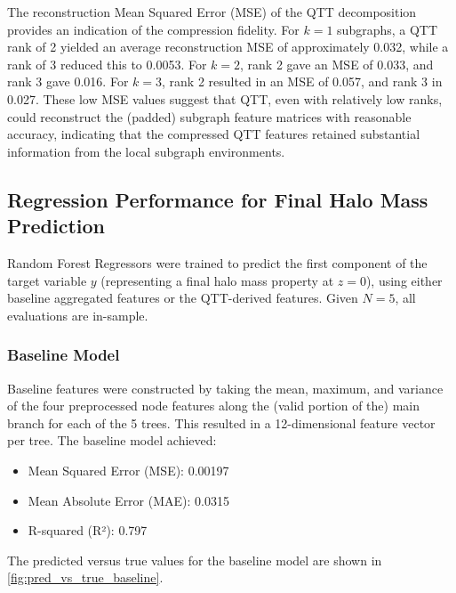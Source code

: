 \documentclass[twocolumn]{aastex631}
\begin{document}
The reconstruction Mean Squared Error (MSE) of the QTT decomposition provides an indication of the compression fidelity. For $k=1$ subgraphs, a QTT rank of 2 yielded an average reconstruction MSE of approximately 0.032, while a rank of 3 reduced this to 0.0053. For $k=2$, rank 2 gave an MSE of 0.033, and rank 3 gave 0.016. For $k=3$, rank 2 resulted in an MSE of 0.057, and rank 3 in 0.027. These low MSE values suggest that QTT, even with relatively low ranks, could reconstruct the (padded) subgraph feature matrices with reasonable accuracy, indicating that the compressed QTT features retained substantial information from the local subgraph environments.

\subsection{Regression Performance for Final Halo Mass Prediction}

Random Forest Regressors were trained to predict the first component of the target variable $y$ (representing a final halo mass property at $z=0$), using either baseline aggregated features or the QTT-derived features. Given $N=5$, all evaluations are in-sample.

\subsubsection{Baseline Model}
Baseline features were constructed by taking the mean, maximum, and variance of the four preprocessed node features along the (valid portion of the) main branch for each of the 5 trees. This resulted in a 12-dimensional feature vector per tree.
The baseline model achieved:
\begin{itemize}
    \item Mean Squared Error (MSE): 0.00197
    \item Mean Absolute Error (MAE): 0.0315
    \item R-squared (R²): 0.797
\end{itemize}
The predicted versus true values for the baseline model are shown in \autoref{fig:pred_vs_true_baseline}.
\end{document}
